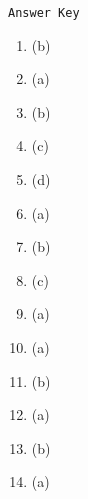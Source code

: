 \begin{center}
\texttt{Answer Key}
\begin{multicols}{5}
\begin{enumerate}
\item (b)
\item (a)
\item (b)
\item (c)
\item (d)
\item (a)
\item (b)
\item (c)
\item (a)
\item (a)
\item (b)
\item (a)
\item (b)
\item (a)
\end{enumerate}
\end{multicols}
\end{center}
